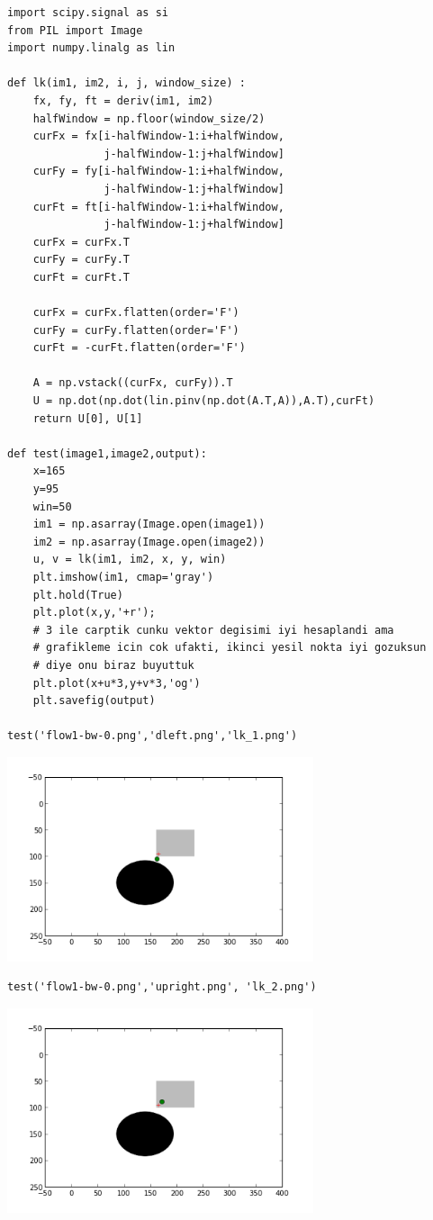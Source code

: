 \documentclass[12pt,fleqn]{article}\usepackage{../../common}
\begin{document}
\begin{verbatim}
import scipy.signal as si
from PIL import Image
import numpy.linalg as lin

def lk(im1, im2, i, j, window_size) :
    fx, fy, ft = deriv(im1, im2)
    halfWindow = np.floor(window_size/2)
    curFx = fx[i-halfWindow-1:i+halfWindow, 
               j-halfWindow-1:j+halfWindow]
    curFy = fy[i-halfWindow-1:i+halfWindow, 
               j-halfWindow-1:j+halfWindow]
    curFt = ft[i-halfWindow-1:i+halfWindow, 
               j-halfWindow-1:j+halfWindow]
    curFx = curFx.T
    curFy = curFy.T
    curFt = curFt.T

    curFx = curFx.flatten(order='F') 
    curFy = curFy.flatten(order='F') 
    curFt = -curFt.flatten(order='F') 
    
    A = np.vstack((curFx, curFy)).T
    U = np.dot(np.dot(lin.pinv(np.dot(A.T,A)),A.T),curFt)
    return U[0], U[1]

def test(image1,image2,output): 
    x=165
    y=95
    win=50
    im1 = np.asarray(Image.open(image1))
    im2 = np.asarray(Image.open(image2))
    u, v = lk(im1, im2, x, y, win)
    plt.imshow(im1, cmap='gray')
    plt.hold(True)
    plt.plot(x,y,'+r');
    # 3 ile carptik cunku vektor degisimi iyi hesaplandi ama
    # grafikleme icin cok ufakti, ikinci yesil nokta iyi gozuksun
    # diye onu biraz buyuttuk
    plt.plot(x+u*3,y+v*3,'og')
    plt.savefig(output)

test('flow1-bw-0.png','dleft.png','lk_1.png')
\end{verbatim}

\includegraphics[height=6cm]{lk_1.png}

\begin{verbatim}
test('flow1-bw-0.png','upright.png', 'lk_2.png')
\end{verbatim}

\includegraphics[height=6cm]{lk_2.png}
\end{document}
